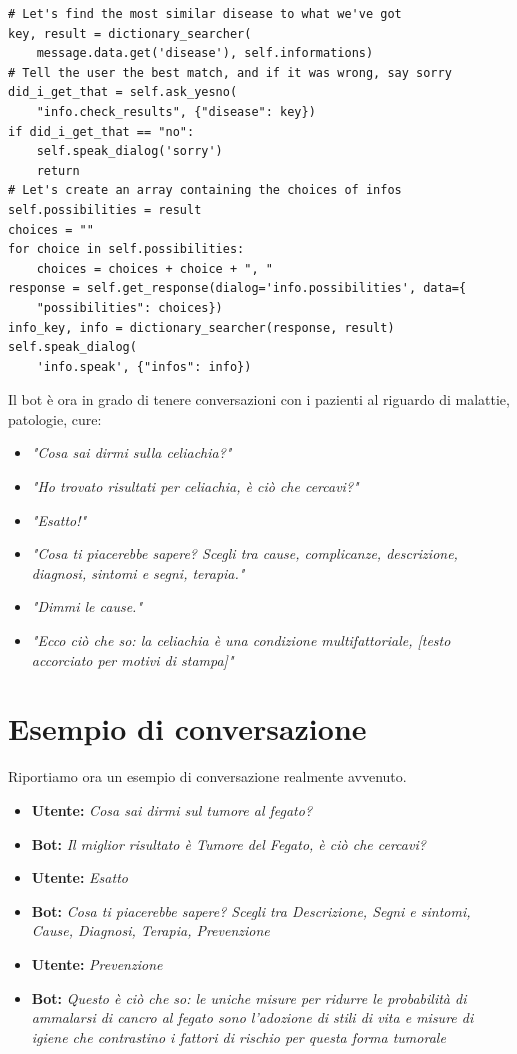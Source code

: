 \begin{verbatim}
# Let's find the most similar disease to what we've got
key, result = dictionary_searcher(
    message.data.get('disease'), self.informations)
# Tell the user the best match, and if it was wrong, say sorry
did_i_get_that = self.ask_yesno(
    "info.check_results", {"disease": key})
if did_i_get_that == "no":
    self.speak_dialog('sorry')
    return
# Let's create an array containing the choices of infos
self.possibilities = result
choices = ""
for choice in self.possibilities:
    choices = choices + choice + ", "
response = self.get_response(dialog='info.possibilities', data={
    "possibilities": choices})
info_key, info = dictionary_searcher(response, result)
self.speak_dialog(
    'info.speak', {"infos": info})
\end{verbatim}
Il bot è ora in grado di tenere conversazioni con i pazienti al riguardo di malattie, patologie, cure:
\begin{itemize}
    \item \textit{"Cosa sai dirmi sulla celiachia?"}
    \item \textit{"Ho trovato risultati per celiachia, è ciò che cercavi?"}
    \item \textit{"Esatto!"}
    \item \textit{"Cosa ti piacerebbe sapere? Scegli tra cause, complicanze, descrizione, diagnosi, sintomi e segni, terapia."}
    \item \textit{"Dimmi le cause."}
    \item \textit{"Ecco ciò che so: la celiachia è una condizione multifattoriale, [testo accorciato per motivi di stampa]"}
\end{itemize}
\section{Esempio di conversazione}
Riportiamo ora un esempio di conversazione realmente avvenuto.
\begin{itemize}
    \item \textbf{Utente:} \textit{Cosa sai dirmi sul tumore al fegato?}
    \item \textbf{Bot:} \textit{Il miglior risultato è Tumore del Fegato, è ciò che cercavi?}
    \item \textbf{Utente:} \textit{Esatto}
    \item \textbf{Bot:} \textit{Cosa ti piacerebbe sapere? Scegli tra Descrizione, Segni e sintomi, Cause, Diagnosi, Terapia, Prevenzione}
    \item \textbf{Utente:} \textit{Prevenzione}
    \item \textbf{Bot:} \textit{Questo è ciò che so: le uniche misure per ridurre le probabilità di ammalarsi di cancro al fegato sono l'adozione di stili di vita e misure di igiene che contrastino i fattori di rischio per questa forma tumorale}
\end{itemize}
